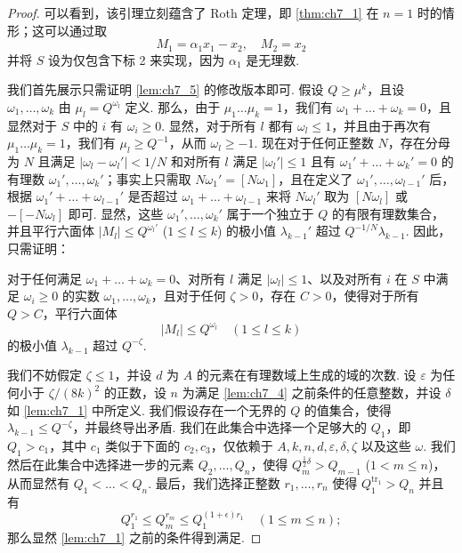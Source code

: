 \begin{proof}
可以看到，该引理立刻蕴含了 Roth 定理，即 \autoref{thm:ch7_1} 在 $n = 1$ 时的情形；这可以通过取
\[M_1 = \alpha_1 x_1 - x_2, \quad M_2 = x_2\]
并将 $S$ 设为仅包含下标 2 来实现，因为 $\alpha_1$ 是无理数.

我们首先展示只需证明 \autoref{lem:ch7_5} 的修改版本即可. 假设 $Q \geqslant \mu^k$，且设 $\omega_1, \ldots, \omega_k$ 由 $\mu_l = Q^{\omega_l}$ 定义. 那么，由于 $\mu_1 \ldots \mu_k = 1$，我们有 $\omega_1 + \ldots + \omega_k = 0$，且显然对于 $S$ 中的 $i$ 有 $\omega_i \geqslant 0$. 显然，对于所有 $l$ 都有 $\omega_l \leqslant 1$，并且由于再次有 $\mu_1 \ldots \mu_k = 1$，我们有 $\mu_l \geqslant Q^{-1}$，从而 $\omega_l \geqslant -1$. 现在对于任何正整数 $N$，存在分母为 $N$ 且满足 $|\omega_l - \omega_l'| < 1/N$ 和对所有 $l$ 满足 $|\omega_l'| \leqslant 1$ 且有 $\omega_1' + \ldots + \omega_k' = 0$ 的有理数 $\omega_1', \dots, \omega_k'$；事实上只需取 $N\omega_1' = [N\omega_1]$，且在定义了 $\omega_1', \dots, \omega_{l-1}'$ 后，根据 $\omega_1' + \ldots + \omega_{l-1}'$ 是否超过 $\omega_1 + \ldots + \omega_{l-1}$ 来将 $N\omega_l'$ 取为 $[N\omega_l]$ 或 $-[-N\omega_l]$ 即可. 显然，这些 $\omega_1', \dots, \omega_k'$ 属于一个独立于 $Q$ 的有限有理数集合，并且平行六面体 $|M_l| \leqslant Q^{\omega_l'}$ ($1 \leqslant l \leqslant k$) 的极小值 $\lambda_{k-1}'$ 超过 $Q^{-1/N}\lambda_{k-1}$. 因此，只需证明：

对于任何满足 $\omega_1 + \dots + \omega_k = 0$、对所有 $l$ 满足 $|\omega_l| \le 1$、以及对所有 $i$ 在 $S$ 中满足 $\omega_i \ge 0$ 的实数 $\omega_1, \dots, \omega_k$，且对于任何 $\zeta > 0$，存在 $C > 0$，使得对于所有 $Q > C$，平行六面体
\[|M_l| \leqslant Q^{\omega_l} \quad (1 \leqslant l \leqslant k)\]
的极小值 $\lambda_{k-1}$ 超过 $Q^{-\zeta}$.

我们不妨假定 $\zeta \leq 1$，并设 $d$ 为 $A$ 的元素在有理数域上生成的域的次数. 设 $\varepsilon$ 为任何小于 $\zeta/(8k)^2$ 的正数，设 $n$ 为满足 \autoref{lem:ch7_4} 之前条件的任意整数，并设 $\delta$ 如 \autoref{lem:ch7_1} 中所定义. 我们假设存在一个无界的 $Q$ 的值集合，使得 $\lambda_{k-1} \leq Q^{-\zeta}$，并最终导出矛盾. 我们在此集合中选择一个足够大的 $Q_1$，即 $Q_1 > c_1$，其中 $c_1$ 类似于下面的 $c_2, c_3$，仅依赖于 $A, k, n, d, \varepsilon, \delta, \zeta$ 以及这些 $\omega$. 我们然后在此集合中选择进一步的元素 $Q_2, \ldots, Q_n$，使得 $Q_m^{\frac{1}{2}\delta} > Q_{m-1}$ ($1 < m \leq n$)，从而显然有 $Q_1 < \dots < Q_n$. 最后，我们选择正整数 $r_1, \ldots, r_n$ 使得 $Q_1^{\text{tr}_1} > Q_n$ 并且有
\[Q_1^{r_1}\leqslant Q_m^{r_m}\leqslant Q_1^{(1+\epsilon)r_1}\quad (1\leqslant m\leqslant n);\]
那么显然 \autoref{lem:ch7_1} 之前的条件得到满足.


\end{proof}
